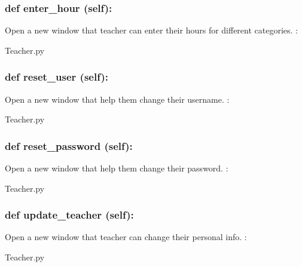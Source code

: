 \hypertarget{class_poly_a14a7ad77ce612b0c54f531d307ee4b39}{
\subsubsection[{def enter_hour (self):}]{\setlength{\rightskip}{0pt plus 5cm}def {enter\_hour} (self):}}\label{class_poly_a14a7ad77ce612b0c54f531d307ee4b39}
Open a new window that teacher can enter their hours for different categories. 
:\begin{DoxyCompactItemize}
\item 
Teacher.\-py\end{DoxyCompactItemize}

\hypertarget{class_poly_a14a7ad77ce612b0c54f531d307ee4b39}{
\subsubsection[{def reset_user (self):}]{\setlength{\rightskip}{0pt plus 5cm}def {reset\_user} (self):}}\label{class_poly_a14a7ad77ce612b0c54f531d307ee4b39}
Open a new window that help them change their username. 
:\begin{DoxyCompactItemize}
\item 
Teacher.\-py\end{DoxyCompactItemize}

\hypertarget{class_poly_a14a7ad77ce612b0c54f531d307ee4b39}{
\subsubsection[{def reset_password (self):}]{\setlength{\rightskip}{0pt plus 5cm}def {reset\_password} (self):}}\label{class_poly_a14a7ad77ce612b0c54f531d307ee4b39}
Open a new window that help them change their password. 
:\begin{DoxyCompactItemize}
\item 
Teacher.\-py\end{DoxyCompactItemize}

\hypertarget{class_poly_a14a7ad77ce612b0c54f531d307ee4b39}{
\subsubsection[{def update_teacher (self):}]{\setlength{\rightskip}{0pt plus 5cm}def {update\_teacher} (self):}}\label{class_poly_a14a7ad77ce612b0c54f531d307ee4b39}
Open a new window that teacher can change their personal info.
:\begin{DoxyCompactItemize}
\item 
Teacher.\-py\end{DoxyCompactItemize}

